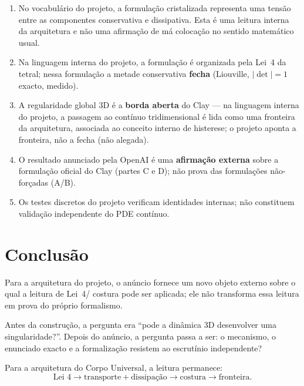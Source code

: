 \documentclass[11pt,a4paper]{article}
\begin{document}
\begin{enumerate}
\item No vocabulário do projeto, a formulação cristalizada
representa uma tensão entre as componentes
conservativa e dissipativa. Esta é uma leitura
interna da arquitetura e não uma afirmação de
má colocação no sentido matemático usual.
\item Na linguagem interna do projeto, a formulação
  é organizada pela Lei~4 da tetral; nessa
  formulação a metade conservativa
  \textbf{fecha} (Liouville, $|\det|=1$ exacto, medido).
\item A regularidade global 3D é a \textbf{borda aberta} do
  Clay --- na linguagem interna do projeto, a passagem
  ao contínuo tridimensional é lida como uma fronteira
  da arquitetura, associada ao conceito interno de
  histerese; o projeto aponta a fronteira, não a fecha
  (não alegada).
\item O resultado anunciado pela OpenAI é uma
  \textbf{afirmação externa} sobre a formulação
  oficial do Clay (partes C e D); não prova das
  formulações não-forçadas (A/B).
\item Os testes discretos do projeto verificam identidades
  internas; não constituem validação independente do PDE
  contínuo.
\end{enumerate}

\section{Conclusão}\label{sec:conclusao}

Para a arquitetura do projeto, o anúncio fornece um
novo objeto externo sobre o qual a leitura de Lei~4/
costura pode ser aplicada; ele não transforma essa
leitura em prova do próprio formalismo.

Antes da construção, a pergunta era ``pode a dinâmica 3D
desenvolver uma singularidade?''. Depois do anúncio, a
pergunta passa a ser: o mecanismo, o enunciado exacto e a
formalização resistem ao escrutínio independente?

Para a arquitetura do Corpo Universal, a leitura permanece:
\begin{equation}\label{eq:costura-final}
\text{Lei~4}
\longrightarrow
\text{transporte}
+\text{dissipação}
\longrightarrow
\text{costura}
\longrightarrow
\text{fronteira}.
\end{equation}
\end{document}
